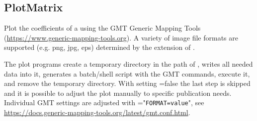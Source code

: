 \clearpage
\subsection{PlotMatrix}\label{PlotMatrix}
Plot the coefficients of a 
using the GMT Generic Mapping Tools (\url{https://www.generic-mapping-tools.org}).
A variety of image file formats are supported (e.g. png, jpg, eps) determined by the extension of .

The plot programs create a temporary directory in the path of , writes all needed data into it,
generates a batch/shell script with the GMT commands, execute it, and remove the temporary directory.
With setting =false the last step is skipped and it is possible to adjust the plot manually
to specific publication needs. Individual GMT settings are adjusted with ="\verb|FORMAT=value|",
see \url{https://docs.generic-mapping-tools.org/latest/gmt.conf.html}.



